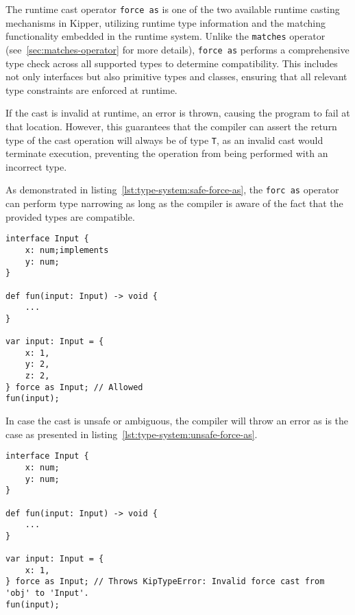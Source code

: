 The runtime cast operator \lstinline|force as| is one of the two available runtime casting mechanisms in Kipper, utilizing runtime type information and the matching functionality embedded in the runtime system. Unlike the \lstinline|matches| operator (see~\ref{sec:matches-operator} for more details), \lstinline|force as| performs a comprehensive type check across all supported types to determine compatibility. This includes not only interfaces but also primitive types and classes, ensuring that all relevant type constraints are enforced at runtime.

If the cast is invalid at runtime, an error is thrown, causing the program to fail at that location. However, this guarantees that the compiler can assert the return type of the cast operation will always be of type \lstinline|T|, as an invalid cast would terminate execution, preventing the operation from being performed with an incorrect type.

As demonstrated in listing~\ref{lst:type-system:safe-force-as}, the \lstinline|forc as| operator can perform type narrowing as long as the compiler is aware of the fact that the provided types are compatible. 

\begin{lstlisting}[language=Kipper,caption=Correctly casting an object to an interface using the \lstinline|force as| operator,label=lst:type-system:safe-force-as]
interface Input {
	x: num;implements
	y: num;
}

def fun(input: Input) -> void {
	...
}

var input: Input = {
	x: 1,
	y: 2,
	z: 2,
} force as Input; // Allowed
fun(input);
\end{lstlisting}

In case the cast is unsafe or ambiguous, the compiler will throw an error as is the case as presented in listing~\ref{lst:type-system:unsafe-force-as}.

\begin{lstlisting}[language=Kipper,caption=Incorrectly casting an object to an interface using the \lstinline|force as| operator resulting in a runtime error,label=lst:type-system:unsafe-force-as]
interface Input {
	x: num;
	y: num;
}

def fun(input: Input) -> void {
	...
}

var input: Input = {
	x: 1,
} force as Input; // Throws KipTypeError: Invalid force cast from 'obj' to 'Input'.
fun(input);
\end{lstlisting}

